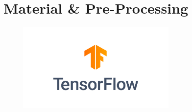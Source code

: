 \chapter{Material \& Pre-Processing}


\begin{figure}
	\includegraphics[width=0.7\textwidth]{figures/logos/tensorflow.png}
\end{figure}